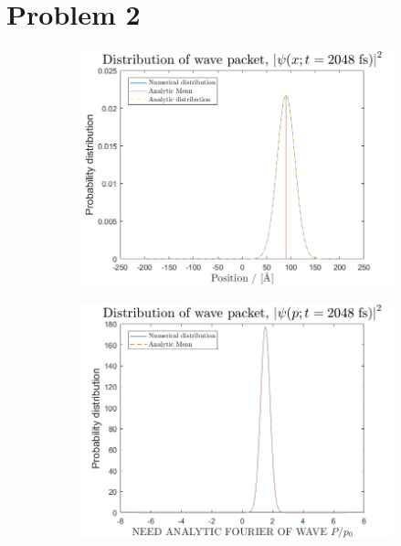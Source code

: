\section*{Problem 2}

\begin{figure}[H]
\centering
\begin{subfigure}[t]{0.7\textwidth}
\includegraphics[width=\textwidth]{graphics/task2/position.png}
\caption{}
\label{fig:2_a}
\end{subfigure}

\begin{subfigure}[t]{0.7\textwidth}
\includegraphics[width=\textwidth]{graphics/task2/momentum.png}
\caption{}
\label{fig:2_b}
\end{subfigure}


\end{figure}
